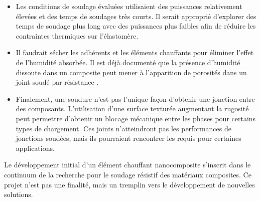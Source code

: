 \begin{itemize}
	\item Les conditions de soudage évaluées utilisaient des puissances relativement élevées et des temps de soudages très courts. 
	Il serait approprié d'explorer des temps de soudage plus long avec des puissances plus faibles afin de réduire les contraintes thermiques sur l'élastomère. 
	\item Il faudrait sécher les adhérents et les éléments chauffants pour éliminer l'effet de l'humidité absorbée. 
	Il est déjà documenté que la présence d'humidité dissoute dans un composite peut mener à l'apparition de porosités dans un joint soudé par résistance \cite{Shi2014}. 
	\item Finalement, une soudure n'est pas l'unique façon d'obtenir une jonction entre des composants. 
	L'utilisation d'une surface texturée augmentant la rugosité peut permettre d'obtenir un blocage mécanique entre les phases pour certains types de chargement. 
	Ces joints n'atteindront pas les performances de jonctions soudées, mais ils pourraient rencontrer les requis pour certaines applications. 
\end{itemize}

Le développement initial d'un élément chauffant nanocomposite s'inscrit dans le continuum de la recherche pour le soudage résistif des matériaux composites. 
Ce projet n'est pas une finalité, mais un tremplin vers le développement de nouvelles solutions. 